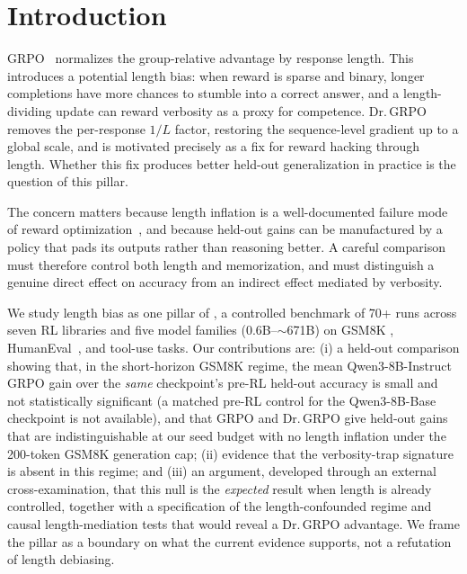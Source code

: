 \section{Introduction}
\label{sec:p4-intro}
GRPO~\citep{shao2024deepseekmath, guo2025deepseekr1} normalizes the group-relative
advantage by response length. This introduces a potential length bias: when reward
is sparse and binary, longer completions have more chances to stumble into a
correct answer, and a length-dividing update can reward verbosity as a proxy for
competence. Dr.\,GRPO~\citep{tong2025drgrpo} removes the per-response
$1/L$ factor, restoring the sequence-level gradient up to a global scale, and is
motivated precisely as a fix for reward hacking through length. Whether this fix
produces better held-out generalization in practice is the question of this pillar.

The concern matters because length inflation is a well-documented failure mode of
reward optimization~\citep{ouyang2022training, christiano2017deeprlhf}, and because
held-out gains can be manufactured by a policy that pads its outputs rather than
reasoning better. A careful comparison must therefore control both length and
memorization, and must distinguish a genuine direct effect on accuracy from an
indirect effect mediated by verbosity.

We study length bias as one pillar of \ours{}, a controlled benchmark of 70+ runs
across seven RL libraries and five model families ($0.6$B--$\sim$671B) on GSM8K
\citep{cobbe2021training}, HumanEval~\citep{chen2021codex}, and tool-use tasks. Our
contributions are: (i) a held-out comparison showing that, in the short-horizon
GSM8K regime, the mean Qwen3-8B-Instruct GRPO gain over the \emph{same} checkpoint's
pre-RL held-out accuracy is small and not statistically significant (a matched pre-RL
control for the Qwen3-8B-Base checkpoint is not available), and that GRPO and Dr.\,GRPO give held-out gains
that are indistinguishable at our seed budget with no length inflation under the
200-token GSM8K generation cap; (ii) evidence that the verbosity-trap signature is
absent in this regime; and (iii) an argument, developed through an external
cross-examination, that this null is the \emph{expected} result when length is
already controlled, together with a specification of the length-confounded regime
and causal length-mediation tests that would reveal a Dr.\,GRPO advantage. We frame
the pillar as a boundary on what the current evidence supports, not a refutation of
length debiasing.

